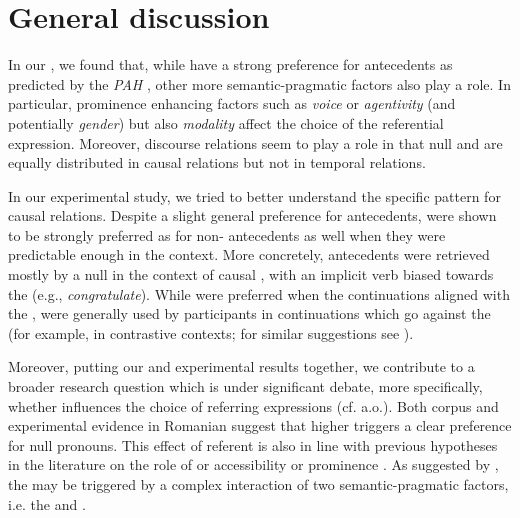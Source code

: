 \documentclass[output=paper,colorlinks,citecolor=brown]{langscibook}
\begin{document}
\section{General discussion}
\label{sect:discussion:Istrate}

In our , we found that, while  have a strong preference for  antecedents as predicted by the \textit{PAH} \citep{carminati2002processing}, other more semantic-pragmatic factors also play a role. In particular, prominence enhancing factors such as \textit{voice} or \textit{agentivity} (and potentially \textit{gender}) but also \textit{modality} affect the choice of the referential expression. Moreover, discourse relations seem to play a role in that null and  are equally distributed in causal relations but not in temporal relations. 

In our experimental study, we tried to better understand the specific pattern for causal relations. Despite a slight general preference for  antecedents,  were shown to be strongly preferred as  for non- antecedents as well when they were predictable enough in the context. More concretely,  antecedents were retrieved mostly by a null  in the context of causal , with an implicit  verb biased towards the  (e.g., \textit{congratulate}). While  were preferred when the continuations aligned with the ,  were generally used by participants in continuations which go against the  (for example, in contrastive contexts; for similar suggestions see \citealt{mayol2010refining}). 

Moreover, putting our  and experimental results together, we contribute to a broader research question which is under significant debate, more specifically, whether  influences the choice of referring expressions (cf. \citealt{arnold2001effect, fukumura2010choosing, rohde2014grammatical, holler2016empirical, modi2017modeling, rosa2017predictability} a.o.). Both corpus and experimental evidence in Romanian suggest that higher  \citep{tily2009refer} triggers a clear preference for null  pronouns. This effect of referent  is also in line with previous hypotheses in the literature on the role of  or accessibility \citep{givon1983topic, ariel1994interpreting, grosz1995centering, chafe1996inferring} or prominence \citep{von2019discourse}. As suggested by \citet{demberg2023systematic}, the  may be triggered by a complex interaction of two semantic-pragmatic factors, i.e. the  and . 
\end{document}
